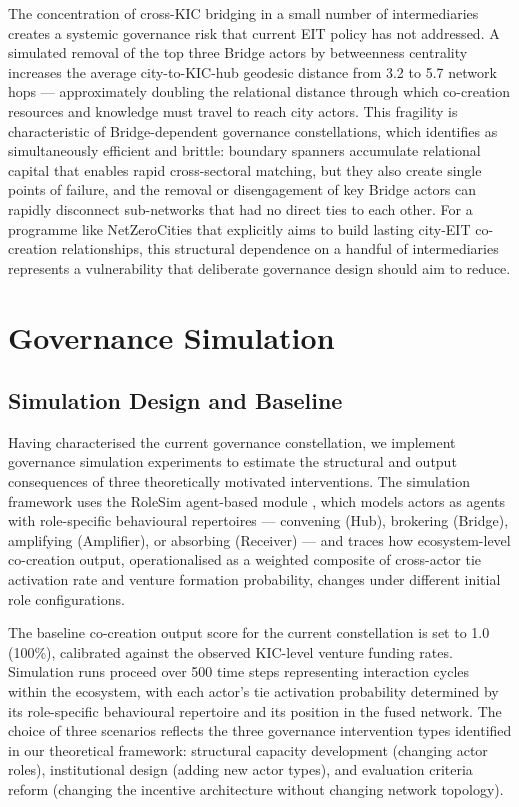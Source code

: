 \documentclass[review,12pt]{elsarticle}
\begin{document}
The concentration of cross-KIC bridging in a small number of intermediaries creates a systemic governance risk that current EIT policy has not addressed. A simulated removal of the top three Bridge actors by betweenness centrality increases the average city-to-KIC-hub geodesic distance from 3.2 to 5.7 network hops --- approximately doubling the relational distance through which co-creation resources and knowledge must travel to reach city actors. This fragility is characteristic of Bridge-dependent governance constellations, which \citet{burt2004structural} identifies as simultaneously efficient and brittle: boundary spanners accumulate relational capital that enables rapid cross-sectoral matching, but they also create single points of failure, and the removal or disengagement of key Bridge actors can rapidly disconnect sub-networks that had no direct ties to each other. For a programme like NetZeroCities that explicitly aims to build lasting city-EIT co-creation relationships, this structural dependence on a handful of intermediaries represents a vulnerability that deliberate governance design should aim to reduce.

\section{Governance Simulation}
\label{sec:simulation}

\subsection{Simulation Design and Baseline}

Having characterised the current governance constellation, we implement governance simulation experiments to estimate the structural and output consequences of three theoretically motivated interventions. The simulation framework uses the RoleSim agent-based module \citep{owoyele2024rolesim}, which models actors as agents with role-specific behavioural repertoires --- convening (Hub), brokering (Bridge), amplifying (Amplifier), or absorbing (Receiver) --- and traces how ecosystem-level co-creation output, operationalised as a weighted composite of cross-actor tie activation rate and venture formation probability, changes under different initial role configurations.

The baseline co-creation output score for the current constellation is set to 1.0 (100\%), calibrated against the observed KIC-level venture funding rates. Simulation runs proceed over 500 time steps representing interaction cycles within the ecosystem, with each actor's tie activation probability determined by its role-specific behavioural repertoire and its position in the fused network. The choice of three scenarios reflects the three governance intervention types identified in our theoretical framework: structural capacity development (changing actor roles), institutional design (adding new actor types), and evaluation criteria reform (changing the incentive architecture without changing network topology).
\end{document}

